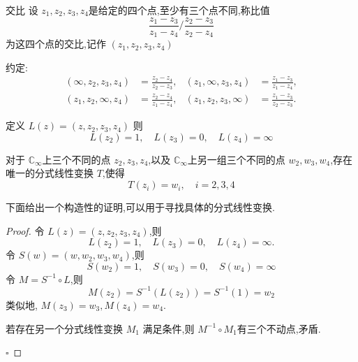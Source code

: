 \documentclass[../../复变函数.tex]{subfiles}
\begin{document}
\begin{definition}{交比}
    设 \(  z_1,z_2,z_3,z_4  \)是给定的四个点,至少有三个点不同,称比值 \[
   \frac{z_1 - z_3}{z_1 - z_4} / \frac{z_2 - z_3}{z_2 - z_4}
    \] 为这四个点的交比,记作 \(  \left( z_1,z_2,z_3,z_4 \right)   \) 
    
    约定: \[
    \begin{aligned}
    (\infty, z_2, z_3, z_4) &= \frac{z_2-z_4}{z_2-z_3}, & (z_1, \infty, z_3, z_4) &= \frac{z_1-z_3}{z_1-z_4}, \\
(z_1, z_2, \infty, z_4) &= \frac{z_2-z_4}{z_1-z_4}, & (z_1, z_2, z_3, \infty) &= \frac{z_1-z_3}{z_2-z_3}. 
    \end{aligned}
    \]
\end{definition}

\begin{proposition}
    定义 \(  L\left( z \right)= \left( z,z_2,z_3,z_4 \right)    \) 则 \[
    L\left( z_2 \right)= 1,\quad L\left( z_3 \right)= 0,\quad L\left( z_4 \right)= \infty   
    \]
\end{proposition}
\begin{theorem}
    对于 \(  \mathbb{C} _{\infty}  \)上三个不同的点 \(  z_2,z_3,z_4  \),以及 \(  \mathbb{C} _{\infty}  \)上另一组三个不同的点 \(  w_2,w_3,w_4  \),存在唯一的分式线性变换 \(  T  \),使得 \[
    T\left( z_{i} \right)= w_{i},\quad i= 2,3,4 
    \]   
\end{theorem}
\begin{remark}
    下面给出一个构造性的证明,可以用于寻找具体的分式线性变换.

\end{remark}
\begin{proof}
    令 \(  L\left( z \right)= \left( z,z_2,z_3,z_4 \right)    \),则 \[
    L\left( z_2 \right)= 1,\quad L\left( z_3 \right)= 0,\quad L\left( z_4 \right)= \infty.   
    \]令 \(  S\left( w \right)= \left( w,w_2,w_3,w_4 \right)    \),则   \[
    S\left( w_2 \right)= 1,\quad S\left( w_3 \right)= 0,\quad S\left( w_4 \right)= \infty   
    \]令 \(  M= S^{-1} \circ L  \),则 \[
    M\left( z_2 \right)= S^{-1} \left( L\left( z_2 \right)  \right)= S^{-1} \left( 1 \right)= w_2   
    \] 类似地, \(  M\left( z_3 \right)= w_3,M\left( z_4 \right)= w_4    \). 

    若存在另一个分式线性变换 \(  M_1  \) 满足条件,则 \(  M^{-1} \circ M_1  \)有三个不动点,矛盾. 

    \hfill $\square$
\end{proof}
\end{document}
